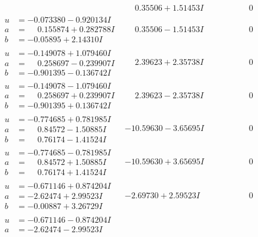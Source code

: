 \documentclass[1p]{elsarticle_modified}
\theoremstyle{definition}
\begin{document}
$$\begin{array}{c|c|c}
 & \phantom{-}0.35506 + 1.51453 I & \phantom{-0.000000 } 0 \\ \hline\begin{aligned}
u &= -0.073380 - 0.920134 I \\
a &= \phantom{-}0.155874 + 0.282788 I \\
b &= -0.05895 + 2.14310 I\end{aligned}
 & \phantom{-}0.35506 - 1.51453 I & \phantom{-0.000000 } 0 \\ \hline\begin{aligned}
u &= -0.149078 + 1.079460 I \\
a &= \phantom{-}0.258697 - 0.239907 I \\
b &= -0.901395 - 0.136742 I\end{aligned}
 & \phantom{-}2.39623 + 2.35738 I & \phantom{-0.000000 } 0 \\ \hline\begin{aligned}
u &= -0.149078 - 1.079460 I \\
a &= \phantom{-}0.258697 + 0.239907 I \\
b &= -0.901395 + 0.136742 I\end{aligned}
 & \phantom{-}2.39623 - 2.35738 I & \phantom{-0.000000 } 0 \\ \hline\begin{aligned}
u &= -0.774685 + 0.781985 I \\
a &= \phantom{-}0.84572 - 1.50885 I \\
b &= \phantom{-}0.76174 - 1.41524 I\end{aligned}
 & -10.59630 - 3.65695 I & \phantom{-0.000000 } 0 \\ \hline\begin{aligned}
u &= -0.774685 - 0.781985 I \\
a &= \phantom{-}0.84572 + 1.50885 I \\
b &= \phantom{-}0.76174 + 1.41524 I\end{aligned}
 & -10.59630 + 3.65695 I & \phantom{-0.000000 } 0 \\ \hline\begin{aligned}
u &= -0.671146 + 0.874204 I \\
a &= -2.62474 + 2.99523 I \\
b &= -0.00887 + 3.26729 I\end{aligned}
 & -2.69730 + 2.59523 I & \phantom{-0.000000 } 0 \\ \hline\begin{aligned}
u &= -0.671146 - 0.874204 I \\
a &= -2.62474 - 2.99523 I \\

\end{aligned}
\end{array}$$
\end{document}
